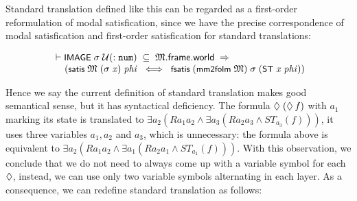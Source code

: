 \documentclass[letterpaper]{article}
\renewcommand{\HOLConst}[1]{{\textsf{\upshape\small #1}}}
\renewcommand{\HOLinline}[1]{\ensuremath{#1}}
\newenvironment{holmath}{\begin{displaymath}\begin{array}{l}}{\end{array}\end{displaymath}\ignorespacesafterend}
\begin{document}
Standard translation defined like this can be regarded as a first-order reformulation of modal satisfication, since we have the precise correspondence of modal satisfication and first-order satisfication for standard translations:

\begin{holmath}
  \ensuremath{\HOLTokenTurnstile}\HOLConst{IMAGE}\;\HOLFreeVar{\ensuremath{\sigma}}\;\ensuremath{\cal{U}}(:\HOLTyOp{num})\;\HOLSymConst{\HOLTokenSubset{}}\;\HOLFreeVar{\ensuremath{\mathfrak{M}}}.\HOLFieldName{frame}.\HOLFieldName{world}\;\HOLSymConst{\HOLTokenImp{}}\\
\;\;\;\;\;(\HOLConst{satis}\;\HOLFreeVar{\ensuremath{\mathfrak{M}}}\;(\HOLFreeVar{\ensuremath{\sigma}}\;\HOLFreeVar{x})\;\HOLFreeVar{phi}\;\HOLSymConst{\HOLTokenEquiv{}}\;\HOLConst{fsatis}\;(\HOLConst{mm2folm}\;\HOLFreeVar{\ensuremath{\mathfrak{M}}})\;\HOLFreeVar{\ensuremath{\sigma}}\;(\HOLConst{ST}\;\HOLFreeVar{x}\;\HOLFreeVar{phi}))
\end{holmath}

Hence we say the current definition of standard translation makes good semantical sense, but it has syntactical deficiency. The formula \HOLinline{\HOLSymConst{\ensuremath{\Diamond}}\;(\HOLSymConst{\ensuremath{\Diamond}}\;\HOLFreeVar{f})} with $a_1$ marking its state is translated to $\exists a_2(R a_1 a_2\land\exists a_3(Ra_2a_3 \land ST_{a_3}(f)))$, it uses three variables $a_1,a_2$ and $a_3$, which is unnecessary: the formula above is equivalent to $\exists a_2(R a_1 a_2\land\exists a_1(Ra_2a_1\land ST_{a_1}(f)))$. With this observation, we conclude that we do not need to always come up with a variable symbol for each \HOLinline{\HOLSymConst{\ensuremath{\Diamond}}}, instead, we can use only two variable symbols alternating in each layer. As a consequence, we can redefine standard translation as follows:
\end{document}
